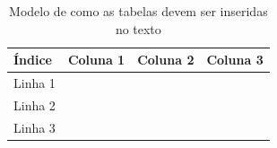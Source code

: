 \begin{table}[htb]
\caption{Modelo de como as tabelas devem ser inseridas no texto}
\label{tb:exemplo}
\centering
\begin{tabular}{|l|c|r|r|} %
\hline
Índice  & Coluna 1 & Coluna 2 & Coluna 3 \\
\hline
Linha 1 &          &          &          \\
Linha 2 &          &          &          \\
Linha 3 &          &          &          \\
\hline
\end{tabular}
\end{table}

